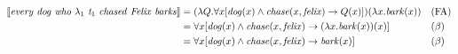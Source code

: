 \documentclass[11pt]{article}
\begin{document}
\begin{align*}
\llbracket \text{\textit{every} \textit{dog} \textit{who} $\lambda_{1}$ \textit{t$_{1}$} \textit{chased} \textit{Felix} \textit{barks}} \rrbracket &= (\lambda Q.\forall x[\mathit{dog}(x) \wedge \mathit{chase}(x, \mathit{felix}) \rightarrow Q(x)])(\lambda x.\mathit{bark}(x)) && \text{(FA)} \\
&= \forall x[\mathit{dog}(x) \wedge \mathit{chase}(x, \mathit{felix}) \rightarrow (\lambda x.\mathit{bark}(x))(x)] && (\beta) \\
&= \forall x[\mathit{dog}(x) \wedge \mathit{chase}(x, \mathit{felix}) \rightarrow \mathit{bark}(x)] && (\beta)
\end{align*}
\end{document}
